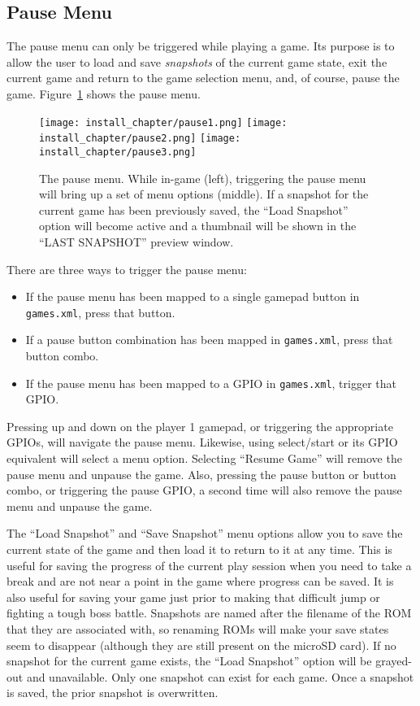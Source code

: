 \subsection{Pause Menu}\label{sec:pause_menu}

The pause menu can only be triggered while playing a game.  Its purpose is to allow the user to load and save \emph{snapshots} of the current game state, exit the current game and return to the game selection menu, and, of course, pause the game. Figure~\ref{fig:pause_menu} shows the pause menu.

\begin{figure}[h]
\centering\texttt{[image: install\_chapter/pause1.png]} {} \texttt{[image: install\_chapter/pause2.png]} {} \texttt{[image: install\_chapter/pause3.png]}
\caption{The pause menu.  While in-game (left), triggering the pause menu will bring up a set of menu options (middle). If a snapshot for the current game has been previously saved, the ``Load Snapshot'' option will become active and a thumbnail will be shown in the ``LAST SNAPSHOT'' preview window.}\label{fig:pause_menu}
\end{figure}

There are three ways to trigger the pause menu:
\begin{itemize}
\item If the pause menu has been mapped to a single gamepad button in \texttt{games.xml}, press that button. 
\item If a pause button combination has been mapped in \texttt{games.xml}, press that button combo.
\item If the pause menu has been mapped to a GPIO in \texttt{games.xml}, trigger that GPIO.
\end{itemize}

Pressing up and down on the player 1 gamepad, or triggering the appropriate GPIOs, will navigate the pause menu.  Likewise, using select/start or its GPIO equivalent will select a menu option. Selecting ``Resume Game'' will remove the pause menu and unpause the game.  Also, pressing the pause button or button combo, or triggering the pause GPIO, a second time will also remove the pause menu and unpause the game.

The ``Load Snapshot'' and ``Save Snapshot'' menu options allow you to save the current state of the game and then load it to return to it at any time. This is useful for saving the progress of the current play session when you need to take a break and are not near a point in the game where progress can be saved.  It is also useful for saving your game just prior to making that difficult jump or fighting a tough boss battle.  Snapshots are named after the filename of the ROM that they are associated with, so renaming ROMs will make your save states seem to disappear (although they are still present on the microSD card).  If no snapshot for the current game exists, the ``Load Snapshot'' option will be grayed-out and unavailable.  Only one snapshot can exist for each game.  Once a snapshot is saved, the prior snapshot is overwritten.

